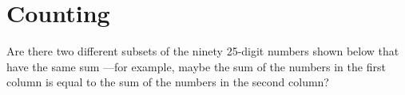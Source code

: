 \chapter{Counting}


\label{why_count_sec}

\iffalse

Are there two different subsets of the ninety 25-digit numbers shown below
that have the same sum ---for example, maybe the sum of the numbers in the
first column is equal to the sum of the numbers in the second column?

